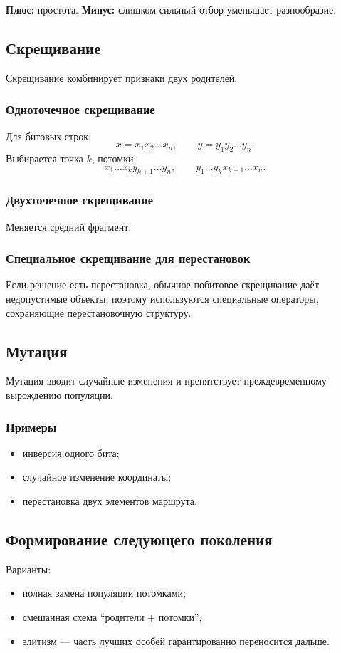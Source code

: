 \documentclass[12pt,a4paper]{article}
\theoremstyle{definition}
\theoremstyle{plain}
\begin{document}
\textbf{Плюс:} простота.
\textbf{Минус:} слишком сильный отбор уменьшает разнообразие.

\subsection{Скрещивание}
Скрещивание комбинирует признаки двух родителей.

\subsubsection{Одноточечное скрещивание}
Для битовых строк:
\[
x=x_1x_2\ldots x_n,\qquad y=y_1y_2\ldots y_n.
\]
Выбирается точка $k$, потомки:
\[
x_1\ldots x_k y_{k+1}\ldots y_n,
\qquad
y_1\ldots y_k x_{k+1}\ldots x_n.
\]

\subsubsection{Двухточечное скрещивание}
Меняется средний фрагмент.

\subsubsection{Специальное скрещивание для перестановок}
Если решение есть перестановка, обычное побитовое скрещивание даёт недопустимые объекты, поэтому используются специальные операторы, сохраняющие перестановочную структуру.

\subsection{Мутация}
Мутация вводит случайные изменения и препятствует преждевременному вырождению популяции.

\subsubsection{Примеры}
\begin{itemize}
\item инверсия одного бита;
\item случайное изменение координаты;
\item перестановка двух элементов маршрута.
\end{itemize}

\subsection{Формирование следующего поколения}
Варианты:
\begin{itemize}
\item полная замена популяции потомками;
\item смешанная схема ``родители + потомки'';
\item элитизм --- часть лучших особей гарантированно переносится дальше.
\end{itemize}
\end{document}
